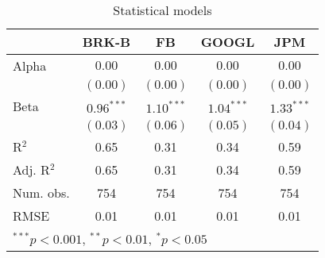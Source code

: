 
\begin{table}
\begin{center}
\begin{tabular}{l c c c c }
\hline
 & BRK-B & FB & GOOGL & JPM \\
\hline
Alpha      & $0.00$       & $0.00$       & $0.00$       & $0.00$       \\
           & $(0.00)$     & $(0.00)$     & $(0.00)$     & $(0.00)$     \\
Beta       & $0.96^{***}$ & $1.10^{***}$ & $1.04^{***}$ & $1.33^{***}$ \\
           & $(0.03)$     & $(0.06)$     & $(0.05)$     & $(0.04)$     \\
\hline
R$^2$      & 0.65         & 0.31         & 0.34         & 0.59         \\
Adj. R$^2$ & 0.65         & 0.31         & 0.34         & 0.59         \\
Num. obs.  & 754          & 754          & 754          & 754          \\
RMSE       & 0.01         & 0.01         & 0.01         & 0.01         \\
\hline
\multicolumn{5}{l}{\scriptsize{$^{***}p<0.001$, $^{**}p<0.01$, $^*p<0.05$}}
\end{tabular}
\caption{Statistical models}
\label{table:coefficients}
\end{center}
\end{table}
